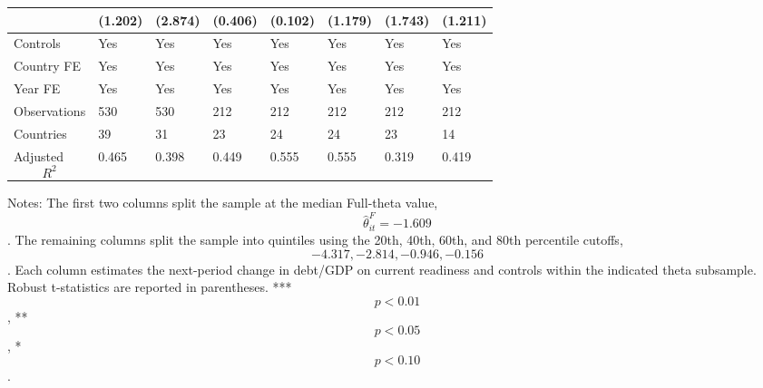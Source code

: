 \begin{table}[H]
\begin{threeparttable}
\begin{tabularx}{\textwidth}{lYYYYYYY}
  & (1.202) & (2.874) & (0.406) & (0.102) & (1.179) & (1.743) & (1.211) \\
\midrule
Controls & Yes & Yes & Yes & Yes & Yes & Yes & Yes \\
Country FE & Yes & Yes & Yes & Yes & Yes & Yes & Yes \\
Year FE & Yes & Yes & Yes & Yes & Yes & Yes & Yes \\
Observations & 530 & 530 & 212 & 212 & 212 & 212 & 212 \\
Countries & 39 & 31 & 23 & 24 & 24 & 23 & 14 \\
Adjusted $$R^2$$ & 0.465 & 0.398 & 0.449 & 0.555 & 0.555 & 0.319 & 0.419 \\
\bottomrule
\end{tabularx}
\begin{tablenotes}[flushleft]\footnotesize
\item Notes: The first two columns split the sample at the median Full-theta value, $$\widehat{\theta}^{F}_{it}=-1.609$$. The remaining columns split the sample into quintiles using the 20th, 40th, 60th, and 80th percentile cutoffs, $$-4.317, -2.814, -0.946, -0.156$$. Each column estimates the next-period change in debt/GDP on current readiness and controls within the indicated theta subsample. Robust t-statistics are reported in parentheses. *** $$p<0.01$$, ** $$p<0.05$$, * $$p<0.10$$.
\end{tablenotes}
\end{threeparttable}
\end{table}

